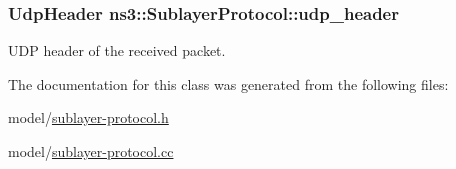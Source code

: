 \hypertarget{classns3_1_1SublayerProtocol_a95b083926386de937c4e9b0a235a4ab8}{
\subsubsection[{udp\-\_\-header}]{\setlength{\rightskip}{0pt plus 5cm}Udp\-Header ns3\-::\-Sublayer\-Protocol\-::udp\-\_\-header\hspace{0.3cm}{\ttfamily [private]}}}\label{classns3_1_1SublayerProtocol_a95b083926386de937c4e9b0a235a4ab8}


U\-D\-P header of the received packet. 



The documentation for this class was generated from the following files\-:\begin{DoxyCompactItemize}
\item 
model/\hyperlink{sublayer-protocol_8h}{sublayer-\/protocol.\-h}\item 
model/\hyperlink{sublayer-protocol_8cc}{sublayer-\/protocol.\-cc}\end{DoxyCompactItemize}
